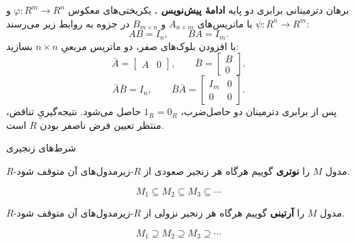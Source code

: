 \begin{frame}[t]{برهان دترمینانی برابری دو پایه}
    \label{lec10:equal-bases-determinant}
    \textbf{ادامهٔ پیش‌نویس .}
    یکریختی‌های معکوس $\varphi:R^m\to R^n$ و $\psi:R^n\to R^m$
    با ماتریس‌های $A_{n\times m}$ و $B_{m\times n}$ در جزوه به روابط زیر می‌رسند:
    \[
        AB=I_n,\qquad BA=I_m.
    \]
    با افزودن بلوک‌های صفر، دو ماتریس مربعیِ $n\times n$ بسازید:
    \[
        \bar A=\begin{bmatrix}A&0\end{bmatrix},
        \qquad
        \bar B=\begin{bmatrix}B\\0\end{bmatrix}.
    \]
    \[
        \bar A\bar B=I_n,\qquad
        \bar B\bar A=
        \begin{bmatrix}I_m&0\\0&0\end{bmatrix}.
    \]
    پس از برابری دترمینان دو حاصل‌ضرب، $1_R=0_R$ حاصل می‌شود.
    نتیجه‌گیریِ تناقض، منتظر تعیین فرض ناصفر بودن $R$ است.
\end{frame}

\begin{frame}[t]{شرط‌های زنجیری}
    \label{lec10:chain-conditions}
    \begin{definition}
        $R$-مدول $M$ را \textbf{نوتری} گوییم هرگاه هر زنجیر صعودی
        از $R$-زیرمدول‌های آن متوقف شود.
    \end{definition}
    \[
        M_1\subseteq M_2\subseteq M_3\subseteq\cdots
    \]
    \begin{definition}
        $R$-مدول $M$ را \textbf{آرتینی} گوییم هرگاه هر زنجیر نزولی
        از $R$-زیرمدول‌های آن متوقف شود.
    \end{definition}
    \[
        M_1\supseteq M_2\supseteq M_3\supseteq\cdots
    \]
\end{frame}

